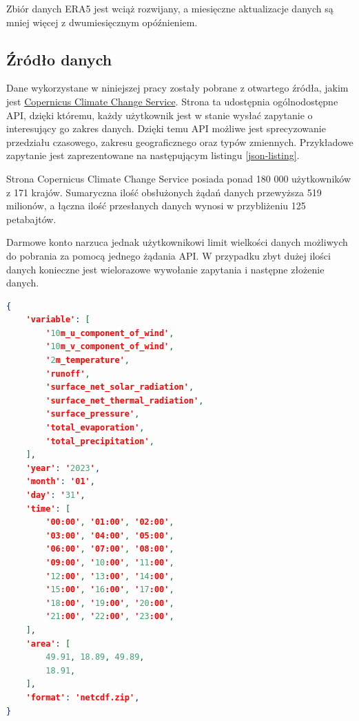 Zbiór danych ERA5 jest wciąż rozwijany, a miesięczne aktualizacje danych są mniej więcej
z dwumiesięcznym opóźnieniem.

\subsection{Źródło danych}

Dane wykorzystane w niniejszej pracy zostały pobrane z otwartego źródła, jakim jest
\href{https://cds.climate.copernicus.eu/cdsapp#!/dataset/reanalysis-era5-land?tab=form}{Copernicus Climate Change Service}.
Strona ta udostępnia ogólnodostępne API, dzięki któremu, każdy użytkownik jest w stanie
wysłać zapytanie o interesujący go zakres danych. Dzięki temu API możliwe jest sprecyzowanie
przedziału czasowego, zakresu geograficznego oraz typów zmiennych. Przykładowe zapytanie jest 
zaprezentowane na następującym listingu \ref{json-listing}.

Strona Copernicus Climate Change Service posiada ponad 180 000 użytkowników z 171 krajów. Sumaryczna
ilość obsłużonych żądań danych przewyższa 519 milionów, a łączna ilość przesłanych danych wynosi
w przybliżeniu 125 petabajtów.

Darmowe konto narzuca jednak użytkownikowi limit wielkości danych możliwych do pobrania 
za pomocą jednego żądania API. W przypadku zbyt dużej ilości danych konieczne
jest wielorazowe wywołanie zapytania i następne złożenie danych.

\begin{lstlisting}[label=json-listing,caption={Przykładowe zapytanie API CDS Climate Copernicus},language=json]
{
    'variable': [
        '10m_u_component_of_wind', 
        '10m_v_component_of_wind', 
        '2m_temperature',
        'runoff', 
        'surface_net_solar_radiation', 
        'surface_net_thermal_radiation',
        'surface_pressure', 
        'total_evaporation', 
        'total_precipitation',
    ],
    'year': '2023',
    'month': '01',
    'day': '31',
    'time': [
        '00:00', '01:00', '02:00',
        '03:00', '04:00', '05:00',
        '06:00', '07:00', '08:00',
        '09:00', '10:00', '11:00',
        '12:00', '13:00', '14:00',
        '15:00', '16:00', '17:00',
        '18:00', '19:00', '20:00',
        '21:00', '22:00', '23:00',
    ],
    'area': [
        49.91, 18.89, 49.89,
        18.91,
    ],
    'format': 'netcdf.zip',
}
\end{lstlisting}

